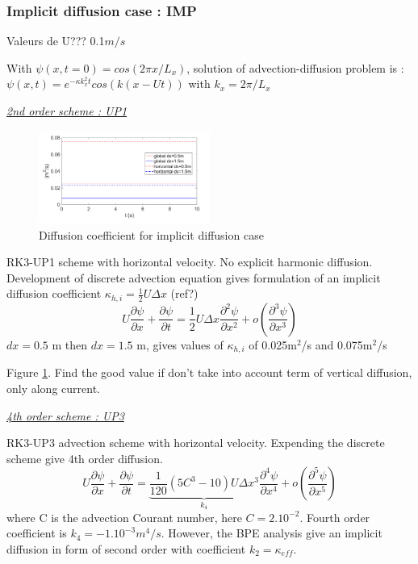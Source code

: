 \subsubsection{Implicit diffusion case : IMP}

\color{red}Valeurs de U??? 0.1$m/s$\color{black}

With $\psi(x,t=0)=cos(2\pi x/L_x)$, solution of advection-diffusion problem is : $\psi(x,t)=e^{-\kappa k_x^2 t}cos(k(x-Ut))$ with $k_x=2\pi/L_x$


\underline{\textit{2nd order scheme : UP1}}
\begin{figure}[h!]
\centering
\includegraphics[width=0.5\textwidth]{./CHAP_BPE/AGBPE_numlab3.png}
\caption{Diffusion coefficient for implicit diffusion case}
\label{fig3numlab}
\end{figure}

RK3-UP1 scheme with horizontal velocity. No explicit harmonic diffusion. Development of discrete advection equation gives formulation of an implicit diffusion coefficient $\kappa_{h,i}=\frac{1}{2}U \Delta x$ (ref?)
\begin{equation}
U \frac{\partial \psi}{\partial x} +\frac{\partial \psi}{\partial t} = \frac{1}{2} U \Delta x  \frac{\partial^2 \psi}{\partial x^2} + o(\frac{\partial^3 \psi}{\partial x^3})
\end{equation}
$dx=0.5$ m then $dx=1.5$ m, gives values of $\kappa_{h,i}$ of 0.025m$^2$/s and 0.075m$^2$/s

Figure \ref{fig3numlab}. Find the good value if don't take into account term of vertical diffusion, only along current.

\underline{\textit{4th order scheme : UP3}}

RK3-UP3 advection scheme with horizontal velocity. Expending the discrete scheme give 4th order diffusion.
\begin{equation}
U \frac{\partial \psi}{\partial x} +\frac{\partial \psi}{\partial t} = \underbrace{\frac{1}{120}(5 C^3-10) U \Delta x^3}_{k_4}  \frac{\partial^4 \psi}{\partial x^4} + o(\frac{\partial^5 \psi}{\partial x^5})
\end{equation}
where C is the advection Courant number, here $C=2 . 10^{-2}$. Fourth order coefficient is $k_4=-1.10^{-3} m^4/s$. However, the BPE analysis give an implicit diffusion in form of second order with coefficient $k_2=\kappa_{eff}$.

